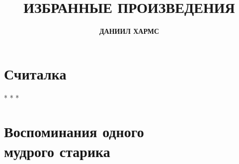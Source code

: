 \documentclass[a4paper,12pt]{book}
\begin{document}
\title{\Huge\bfseries\MakeUppercase{Избранные произведения}}
\author{\LARGE\bfseries\MakeUppercase{Даниил Хармс}}
\date{}
\maketitle

\chapter*{Считалка}


\vspace{0.3cm}
\begin{center}
* * *
\end{center}

\chapter*{Воспоминания одного \protect \\ мудрого старика}

\end{document}
